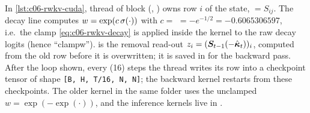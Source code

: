 \begin{implnote}[title={In the code: the CUDA recurrence}]
In \cref{lst:c06-rwkv-cuda}, thread  of block (, ) owns row $i$ of
the state,  $=S_{ij}$. The decay line computes
$w=\exp(c\,\sigma(\cdot))$ with $c=$  $=-e^{-1/2}=-0.6065306597$,
i.e.\ the clamp \eqref{eq:c06-rwkv-decay} is applied inside the kernel to the raw decay logits
(hence ``clampw'').  is the removal read-out $z_i=(\bm{S}_{t-1}(-\hat{\bm\kappa}_t))_i$,
computed from the old row before it is overwritten; it is saved in  for the
backward pass. After the loop shown, every  (16) steps the thread writes its
row into a checkpoint tensor  of shape \texttt{[B, H, T/16, N, N]}; the backward kernel
restarts from these checkpoints. The older kernel  in the same folder uses
the unclamped $w=\exp(-\exp(\cdot))$, and the inference kernels live in
.
\end{implnote}


